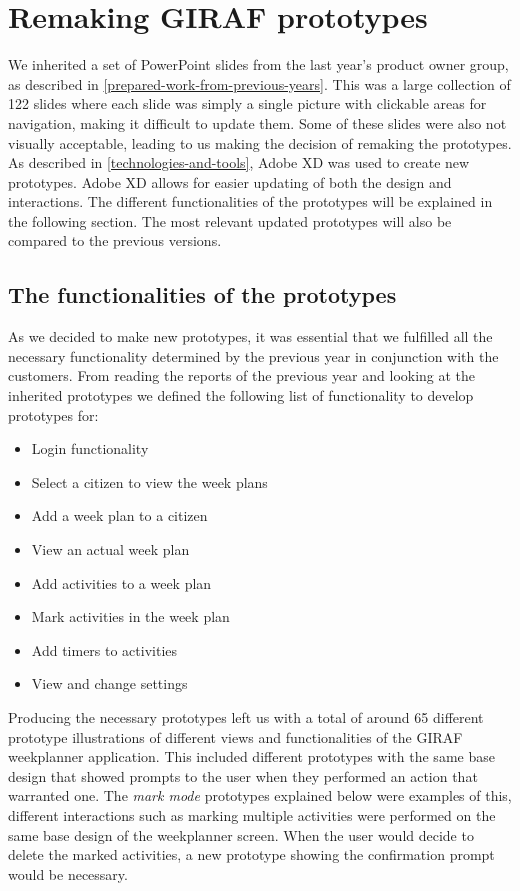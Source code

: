 \section{Remaking GIRAF prototypes}
We inherited a set of PowerPoint slides from the last year's product owner group, as described in \autoref{prepared-work-from-previous-years}.
This was a large collection of 122 slides where each slide was simply a single picture with clickable areas for navigation, making it difficult to update them.
Some of these slides were also not visually acceptable, leading to us making the decision of remaking the prototypes.
As described in \autoref{technologies-and-tools}, Adobe XD was used to create new prototypes.
Adobe XD allows for easier updating of both the design and interactions.
The different functionalities of the prototypes will be explained in the following section.
The most relevant updated prototypes will also be compared to the previous versions.

\subsection{The functionalities of the prototypes}
As we decided to make new prototypes, it was essential that we fulfilled all the necessary functionality determined by the previous year in conjunction with the customers.
From reading the reports of the previous year and looking at the inherited prototypes we defined the following list of functionality to develop prototypes for:
\begin{itemize}
    \item Login functionality
    \item Select a citizen to view the week plans
    \item Add a week plan to a citizen
    \item View an actual week plan
    \item Add activities to a week plan
    \item Mark activities in the week plan
    \item Add timers to activities
    \item View and change settings
\end{itemize}
Producing the necessary prototypes left us with a total of around 65 different prototype illustrations of different views and functionalities of the GIRAF weekplanner application.
This included different prototypes with the same base design that showed prompts to the user when they performed an action that warranted one.
The \textit{mark mode} prototypes explained below were examples of this, different interactions such as marking multiple activities were performed on the same base design of the weekplanner screen.
When the user would decide to delete the marked activities, a new prototype showing the confirmation prompt would be necessary.

